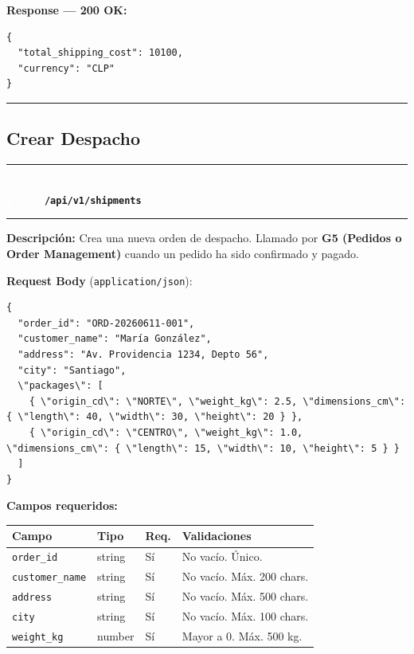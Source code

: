 \documentclass[11pt, a4paper]{article}
\newcommand{\httpmethod}[2]{%
  \colorbox{#1}{\textcolor{white}{\textbf{\small\textsf{#2}}}}%
}
\newcommand{\routeheader}[3]{%
  \noindent\rule{\textwidth}{1.5pt}\\[0.3em]
  \httpmethod{#1}{#2}\;\texttt{\bfseries #3}\\[0.3em]
  \rule{\textwidth}{0.4pt}
  \vspace{0.3cm}
}
\begin{document}
\textbf{Response --- 200 OK:}

\begin{lstlisting}
{
  "total_shipping_cost": 10100,
  "currency": "CLP"
}
\end{lstlisting}

\noindent\rule{\textwidth}{0.4pt}

\subsection{Crear Despacho}

\routeheader{post}{POST}{/api/v1/shipments}

\textbf{Descripción:} Crea una nueva orden de despacho. Llamado por
\textbf{G5 (Pedidos o Order Management)} cuando un pedido ha sido confirmado y pagado.

\vspace{0.3cm}
\textbf{Request Body} (\texttt{application/json}):

\begin{lstlisting}
{
  "order_id": "ORD-20260611-001",
  "customer_name": "María González",
  "address": "Av. Providencia 1234, Depto 56",
  "city": "Santiago",
  \"packages\": [
    { \"origin_cd\": \"NORTE\", \"weight_kg\": 2.5, \"dimensions_cm\": { \"length\": 40, \"width\": 30, \"height\": 20 } },
    { \"origin_cd\": \"CENTRO\", \"weight_kg\": 1.0, \"dimensions_cm\": { \"length\": 15, \"width\": 10, \"height\": 5 } }
  ]
}
\end{lstlisting}

\textbf{Campos requeridos:}
\begin{table}[h!]
\small
\begin{tabularx}{\textwidth}{l l l X}
  \toprule
  \textbf{Campo} & \textbf{Tipo} & \textbf{Req.} & \textbf{Validaciones} \\
  \midrule
  \texttt{order\_id}      & string & Sí & No vacío. Único. \\
  \texttt{customer\_name} & string & Sí & No vacío. Máx. 200 chars. \\
  \texttt{address}        & string & Sí & No vacío. Máx. 500 chars. \\
  \texttt{city}           & string & Sí & No vacío. Máx. 100 chars. \\
  \texttt{weight\_kg}     & number & Sí & Mayor a 0. Máx. 500 kg. \\
  \bottomrule
\end{tabularx}
\end{table}
\end{document}
